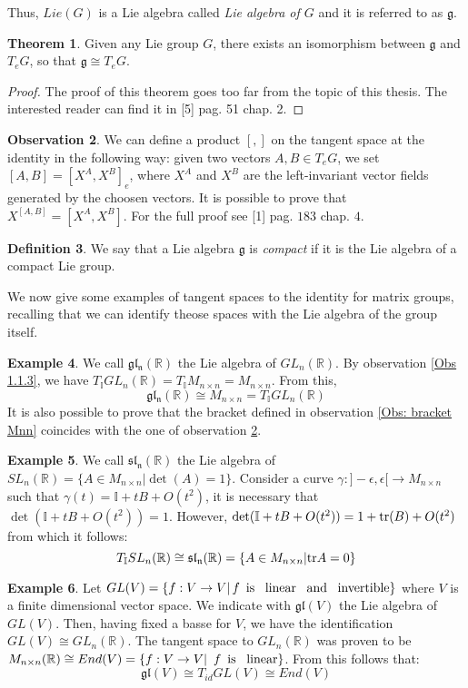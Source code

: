 \documentclass[12pt,a4paper]{report}
\theoremstyle{definition}
\newtheorem{Def}{Definition}[chapter]
\theoremstyle{Theorem}
\newtheorem{Theo}[Def]{Theorem}
\theoremstyle{definition}
\newtheorem{Ex}[Def]{Example}
\theoremstyle{definition}
\newtheorem{Obs}[Def]{Observation}
\begin{document}
		Thus, $Lie(G)$ is a Lie algebra called \textit{Lie algebra of $G$} and it is referred to as $\mathfrak{g}$.
		\begin{Theo}
			Given any Lie group $G$, there exists an isomorphism between $\mathfrak{g}$ and $T_eG$, so that $\mathfrak{g}\cong T_eG$.
		\end{Theo}
		\begin{proof}
			The proof of this theorem goes too far from the topic of this thesis. The interested reader can find it in [5] pag. 51 chap. 2.
		\end{proof}
		\begin{Obs}\label{Obs: bracket T}
			We can define a product $[,]$ on the tangent space at the identity in the following way: given two vectors $A,B\in T_eG$, we set $[A,B]=[X^A,X^B]_e$, where $X^A$ and $X^B$ are the left-invariant vector fields generated by the choosen vectors. It is possible to prove that $X^{[A,B]}=[X^A,X^B]$. 
			For the full proof see [1] pag. $183$ chap. $4$.
		\end{Obs}
		\begin{Def}
			We say that a Lie algebra $\mathfrak{g}$ is \textit{compact} if it is the Lie algebra of a compact Lie group.
		\end{Def}
		We now give some examples of tangent spaces to the identity for matrix groups, recalling that we can identify theose spaces with the Lie algebra of the group itself.
		\begin{Ex}
			We call $\mathfrak{gl_n(\mathbb{R})}$ the Lie algebra of $GL_n(\mathbb{R})$.
			By observation \ref{Obs 1.1.3}, we have $T_\mathbb{I}GL_n(\mathbb{R})=T_\mathbb{I}M_{n\times n}=M_{n\times n}$. From this, $$\mathfrak{gl_n(\mathbb{R})}\cong M_{n\times n}= T_\mathbb{I}GL_n(\mathbb{R})$$
			It is also possible to prove that the bracket defined in observation \ref{Obs: bracket Mnn} coincides with the one of observation \ref{Obs: bracket T}.
		\end{Ex}
		\begin{Ex}
			We call $\mathfrak{sl_n(\mathbb{R})}$ the Lie algebra of $SL_n(\mathbb{R})=\{A\in M_{n\times n}|\det(A)=1\}$.
			Consider a curve $\gamma:]-\epsilon,\epsilon[\rightarrow M_{n\times n}$ such that $\gamma(t)=\mathbb{I}+tB+O(t^2)$, it is necessary that $\det(\mathbb{I}+tB+O(t^2))=1$. However, $\det(\mathbb{I}+tB+O(t^2))=1+\hbox{tr}(B)+O(t^2)$ from which it follows: $$T_\mathbb{I}SL_n(\mathbb{R})\cong \mathfrak{sl_n(\mathbb{R})}=\{A\in M_{n\times n}|\hbox{tr}A=0\}$$ 
		\end{Ex}
		\begin{Ex}
			Let $GL(V)=\{f:V\rightarrow V|\, \textnormal{$f$\,  is \, linear \, and \, invertible}\}$ where $V$ is a finite dimensional vector space. We indicate with $\mathfrak{gl}(V)$ the Lie algebra of $GL(V)$.  Then, having fixed a basse for $V$, we have the identification $GL(V)\cong GL_n(\mathbb{R})$. The tangent space to $GL_n(\mathbb{R})$ was proven to be $M_{n\times n}(\mathbb{R})\cong End(V)=\{f:V\rightarrow V|\textnormal{\, $f$\, is \, linear}\}$. From this follows that: 
			$$\mathfrak{gl}(V)\cong T_{id}GL(V)\cong End(V)$$ 
		\end{Ex}
\end{document}
